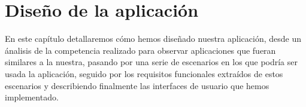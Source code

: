 
\cleardoublepage


\chapter{Diseño de la aplicación}
\label{makereference3}
En este capítulo detallaremos cómo hemos diseñado nuestra aplicación, desde un ánalisis de la competencia realizado para 
observar aplicaciones que fueran similares a la nuestra, pasando por una serie de escenarios en los que podría ser usada la aplicación, 
seguido por los requisitos funcionales extraídos de estos escenarios y describiendo finalmente las interfaces de usuario que hemos implementado.

